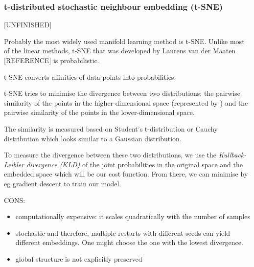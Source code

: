 \documentclass[journal, a4paper]{IEEEtran}
\begin{document}
\hfill
\subsubsection{t-distributed stochastic neighbour embedding (t-SNE)}
[UNFINISHED]

Probably the most widely used manifold learning method is t-SNE.
Unlike most of the linear methods, t-SNE that was developed by Laurens van der Maaten [REFERENCE] is probabilistic.

t-SNE converts affinities of data points into probabilities. 

t-SNE tries  to minimise the divergence between two distributions: the pairwise similarity of the points in the higher-dimensional space (represented by ) and the pairwise similarity of the points in the lower-dimensional space.

The similarity is measured based on Student's t-distribution or Cauchy distribution which looks similar to a Gaussian distribution.


To measure the divergence between these two distributions, we use the \textit{Kullback-Leibler divergence (KLD)} of the joint probabilities in the original space and the embedded space which will be our cost function. From there, we can minimise by eg gradient descent to train our model.


CONS: 
\begin{itemize}
		\item computationally expensive: it scales quadratically with the number of samples
		\item stochastic and therefore, multiple restarts with different seeds can yield different embeddings. One might choose the one with the lowest divergence.
		\item global structure is not explicitly preserved
	\end{itemize}
\end{document}
